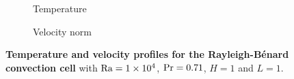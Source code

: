 \begin{figure}
\centering
\begin{subfigure}[t]{.33\textwidth}
	\centering
	\caption{Temperature}
\end{subfigure} \qquad
\begin{subfigure}[t]{.33\textwidth}
	\centering
	\caption{Velocity norm}
\end{subfigure}
\caption{\textbf{Temperature and velocity profiles for the Rayleigh-B\'enard convection cell} with $\text{Ra}=\num{1e4}$, $\text{Pr}=0.71$, $H=1$ and $L=1$.}
\label{fig:rayleigh_convection}
\end{figure}

